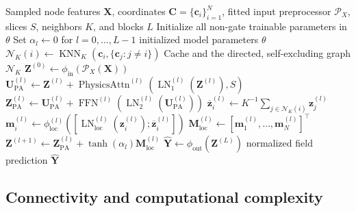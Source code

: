 \documentclass[a4paper,fleqn]{cas-sc}
\begin{document}
\begin{algorithm}[H]
\caption{Separated RAPTOR initialization, graph caching, and forward propagation}
\label{alg:raptor}
\footnotesize
\begin{algorithmic}[1]
\Require Sampled node features \(\mathbf X\), coordinates \(\mathbf C=\{\mathbf c_i\}_{i=1}^{N}\), fitted input preprocessor \(\mathcal P_X\), slices \(S\), neighbors \(K\), and blocks \(L\)
    \State Initialize all non-gate trainable parameters in \(\theta\)
    \State Set \(\alpha_l\gets0\) for \(l=0,\ldots,L-1\)
    \State \Return initialized model parameters \(\theta\)
\EndProcedure
{}
        \State \(\mathcal N_K(i)\gets\operatorname{KNN}_K
        (\mathbf c_i,\{\mathbf c_j:j\ne i\})\)
    \EndFor
    \State Cache and \Return the directed, self-excluding graph \(\mathcal N_K\)
\EndProcedure
{}
    \State \(\mathbf Z^{(0)}\gets\phi_{\mathrm{in}}
    \!\left(\mathcal P_X(\mathbf X)\right)\)
        \State \(\mathbf U_{\mathrm{PA}}^{(l)}\gets\mathbf Z^{(l)}+
        \operatorname{PhysicsAttn}^{(l)}
        \!\left(\operatorname{LN}_{1}^{(l)}(\mathbf Z^{(l)}),S\right)\)
        \State \(\mathbf Z_{\mathrm{PA}}^{(l)}\gets\mathbf U_{\mathrm{PA}}^{(l)}+
        \operatorname{FFN}^{(l)}
        \!\left(\operatorname{LN}_{2}^{(l)}(\mathbf U_{\mathrm{PA}}^{(l)})\right)\)
            \State \(\overline{\mathbf z}_{i}^{(l)}\gets
            K^{-1}\!\sum_{j\in\mathcal N_K(i)}\mathbf z_j^{(l)}\)
            \State \(\mathbf m_i^{(l)}\gets\phi_{\mathrm{loc}}^{(l)}
            \!\left([\operatorname{LN}_{\mathrm{loc}}^{(l)}(\mathbf z_i^{(l)});
            \overline{\mathbf z}_{i}^{(l)}]\right)\)
        \EndFor
        \State \(\mathbf M_{\mathrm{loc}}^{(l)}\gets
        [\mathbf m_1^{(l)},\ldots,\mathbf m_N^{(l)}]^{\top}\)
        \State \(\mathbf Z^{(l+1)}\gets\mathbf Z_{\mathrm{PA}}^{(l)}+
        \tanh(\alpha_l)\mathbf M_{\mathrm{loc}}^{(l)}\)
    \EndFor
    \State \(\widehat{\mathbf Y}\gets\phi_{\mathrm{out}}(\mathbf Z^{(L)})\)
    \State \Return normalized field prediction \(\widehat{\mathbf Y}\)
\EndProcedure
\end{algorithmic}
\end{algorithm}

\subsection{Connectivity and computational complexity}
\label{subsec:complexity}
\end{document}
